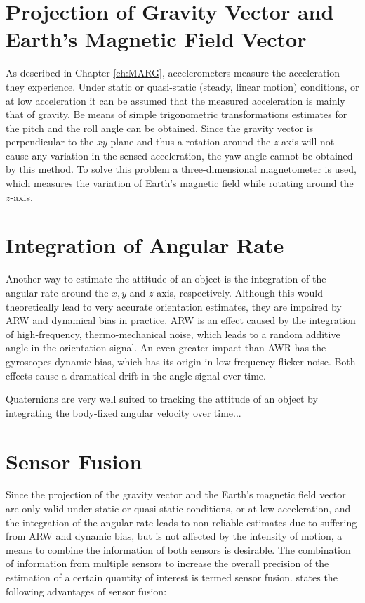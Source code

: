 \section{Projection of Gravity Vector and Earth's Magnetic Field Vector}

As described in Chapter \ref{ch:MARG}, accelerometers measure the acceleration they experience. Under static or quasi-static (steady, linear motion) conditions, or at low acceleration it can be assumed that the measured acceleration is mainly that of gravity. Be means of simple trigonometric transformations estimates for the pitch and the roll angle can be obtained. Since the gravity vector is perpendicular to the $xy$-plane and thus a rotation around the $z$-axis will not cause any variation in the sensed acceleration, the yaw angle cannot be obtained by this method. To solve this problem a three-dimensional magnetometer is used, which measures the variation of Earth's magnetic field while rotating around the $z$-axis.

\section{Integration of Angular Rate}

Another way to estimate the attitude of an object is the integration of the angular rate around the $x, y$ and $z$-axis, respectively. Although this would theoretically lead to very accurate orientation estimates, they are impaired by \gls{ARW} and dynamical bias in practice. \gls{ARW} is an effect caused by the integration of high-frequency, thermo-mechanical noise, which leads to a random additive angle in the orientation signal. An even greater impact than AWR has the gyroscopes dynamic bias, which has its origin in low-frequency flicker noise. Both effects cause a dramatical drift in the angle signal over time.

Quaternions are very well suited to tracking the attitude of an object by integrating the body-fixed angular velocity over time...

\section{Sensor Fusion}

Since the projection of the gravity vector and the Earth's magnetic field vector are only valid under static or quasi-static conditions, or at low acceleration, and the integration of the angular rate leads to non-reliable estimates due to suffering from \gls{ARW} and dynamic bias, but is not affected by the intensity of motion, a means to combine the information of both sensors is desirable. The combination of information from multiple sensors to increase the overall precision of the estimation of a certain quantity of interest is termed sensor fusion. \citeauthor{raol2009multi} \cite{raol2009multi} states the following advantages of sensor fusion:
 
